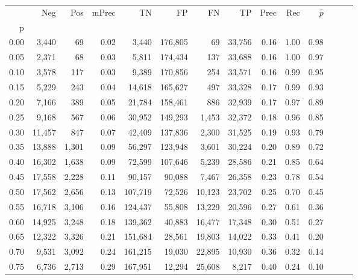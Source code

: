 \begin{tabular}{rrrrrrrrrrrrrr}
\toprule
{} &     Neg &    Pos & mPrec &       TN &       FP &      FN &      TP &  Prec &   Rec & $\hat{p}$ \\
p    &         &        &       &          &          &         &         &       &       &           \\
\midrule
0.00 &   3,440 &     69 &  0.02 &    3,440 &  176,805 &      69 &  33,756 &  0.16 &  1.00 &      0.98 \\
0.05 &   2,371 &     68 &  0.03 &    5,811 &  174,434 &     137 &  33,688 &  0.16 &  1.00 &      0.97 \\
0.10 &   3,578 &    117 &  0.03 &    9,389 &  170,856 &     254 &  33,571 &  0.16 &  0.99 &      0.95 \\
0.15 &   5,229 &    243 &  0.04 &   14,618 &  165,627 &     497 &  33,328 &  0.17 &  0.99 &      0.93 \\
0.20 &   7,166 &    389 &  0.05 &   21,784 &  158,461 &     886 &  32,939 &  0.17 &  0.97 &      0.89 \\
0.25 &   9,168 &    567 &  0.06 &   30,952 &  149,293 &   1,453 &  32,372 &  0.18 &  0.96 &      0.85 \\
0.30 &  11,457 &    847 &  0.07 &   42,409 &  137,836 &   2,300 &  31,525 &  0.19 &  0.93 &      0.79 \\
0.35 &  13,888 &  1,301 &  0.09 &   56,297 &  123,948 &   3,601 &  30,224 &  0.20 &  0.89 &      0.72 \\
0.40 &  16,302 &  1,638 &  0.09 &   72,599 &  107,646 &   5,239 &  28,586 &  0.21 &  0.85 &      0.64 \\
0.45 &  17,558 &  2,228 &  0.11 &   90,157 &   90,088 &   7,467 &  26,358 &  0.23 &  0.78 &      0.54 \\
0.50 &  17,562 &  2,656 &  0.13 &  107,719 &   72,526 &  10,123 &  23,702 &  0.25 &  0.70 &      0.45 \\
0.55 &  16,718 &  3,106 &  0.16 &  124,437 &   55,808 &  13,229 &  20,596 &  0.27 &  0.61 &      0.36 \\
0.60 &  14,925 &  3,248 &  0.18 &  139,362 &   40,883 &  16,477 &  17,348 &  0.30 &  0.51 &      0.27 \\
0.65 &  12,322 &  3,326 &  0.21 &  151,684 &   28,561 &  19,803 &  14,022 &  0.33 &  0.41 &      0.20 \\
0.70 &   9,531 &  3,092 &  0.24 &  161,215 &   19,030 &  22,895 &  10,930 &  0.36 &  0.32 &      0.14 \\
0.75 &   6,736 &  2,713 &  0.29 &  167,951 &   12,294 &  25,608 &   8,217 &  0.40 &  0.24 &      0.10 \\

\end{tabular}
